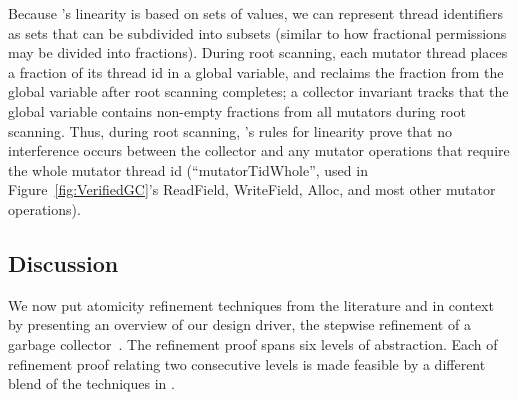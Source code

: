 Because \civl's linearity is based on sets of values,
we can represent thread identifiers as sets that can be subdivided into subsets
(similar to how fractional permissions may be divided into fractions).
During root scanning, each mutator thread places a fraction of its thread id in a global variable,
and reclaims the fraction from the global variable after root scanning completes;
a collector invariant tracks that the global variable contains non-empty fractions from all mutators during root scanning.
Thus, during root scanning, \civl's rules for linearity prove that no interference occurs
between the collector and any mutator operations that require the whole mutator thread id
(``mutatorTidWhole'', used in Figure~\ref{fig:VerifiedGC}'s ReadField, WriteField, Alloc,
and most other mutator operations).

\subsection{Discussion}
We now put atomicity refinement techniques from the literature and
\civl in context by presenting an overview of our design
driver, the stepwise refinement of a garbage collector~\cite{gc-techreport}.
The refinement proof spans six levels of abstraction. 
Each of refinement proof relating two consecutive levels is made feasible by a different
blend of the techniques in \civl. 

